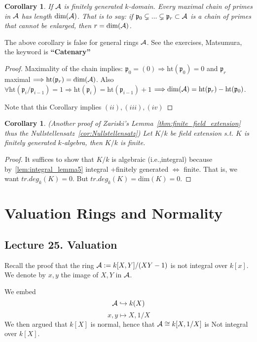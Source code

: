 \documentclass[11pt]{article}
\newtheorem{cor}[thm]{Corollary}
\newcommand{\scp}{{\mathfrak p}}
\newcommand{\cala}{{\cal A}}
\newcommand{\Lrta}{\Longrightarrow}
\newcommand{\Llrta}{\Longleftrightarrow}
\newcommand{\inj}{\hookrightarrow}
\begin{document}
\begin{cor}
If $\cala$ is  finitely generated $k$-domain. Every maximal chain of primes in $\cala$ has length $\text{dim}(\cala)$. That is to say: if $\scp_0\subsetneq ...\subsetneq \scp_r\subset \cala$ is a chain of primes that cannot be enlarged, then $r=\text{dim}(\cala)$.
\end{cor}
The above corollary is false for general rings $\cala$. See the exercises, Matsumura, the keyword is \textbf{``Catenary''}
\begin{proof}
Maximality of the chain implies: $\scp_0=(0)\Lrta \text{ht}(\scp_0)=0$ and $\scp_r$ maximal $\Lrta \text{ht}(\scp_r)=\text{dim}(\cala)$. Also $\forall \text{ht}(\scp_i/\scp_{i-1})=1\Lrta \text{ht}(\scp_i)=\text{ht}(\scp_{i-1})+1$ $\Lrta \text{dim}(\cala)=\text{ht}(\scp_r)-\text{ht}(\scp_0)$.

Note that this Corollary implies $(ii),(iii),(iv)$
\end{proof} 

\begin{cor}
(Another proof of Zariski's Lemma~\ref{thm:finite_field_extension} thus the Nullstellensatz~\ref{cor:Nullstellensatz}) Let $K/k$ be field extension s.t. $K$ is finitely generated $k$-algebra, then $K/k$ is finite.
\end{cor}
\begin{proof}
It suffices to show that $K/k$ is algebraic (i.e.,integral) because by~\ref{lem:integral_lemma5} integral +finitely generated $\Llrta$ finite. That is, we want $tr.deg_k(K)=0$. But $tr.deg_k(K)=\text{dim}(K)=0$.
\end{proof}


\section{Valuation Rings and Normality}
\subsection{Lecture 25. Valuation}
Recall the proof that the ring $\cala:=k[X,Y]/(XY-1)$ is not integral over $k[x]$. We denote by $x,y$ the image of $X,Y$ in $\cala$.

We embed 
$$\cala\inj k(X)$$
$$
x,y\longmapsto X,1/X
$$
We then argued that $k[X]$ is normal, hence that $\cala \cong k[X,1/X]$ is Not integral over $k[X]$.
\end{document}
